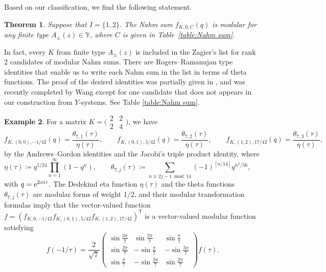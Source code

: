 \documentclass[10pt,a4paper]{amsart}
\numberwithin{equation}{section}
\newtheorem{Theorem}{Theorem}[section]
\theoremstyle{definition}
\newtheorem{Example}[Theorem]{Example}
\begin{document}
Based on our classification, we find the following statement.
\begin{Theorem}
 Suppose that $I= \{1, 2\}$.
 The Nahm sum $f_{K, 0, C} (q)$ is modular for any finite type $A_\pm (z) \in \mathbb{Y}$,
 where $C$ is given in Table~{\rm\ref{table:Nahm sum}}.
\end{Theorem}
In fact, every $K$ from finite type $A_\pm(z)$ is included in the Zagier's list \cite[Table 2]{Zagier}
for rank~$2$ candidates of modular Nahm sums.
There are Rogers--Ramanujan type identities that enable us to write each Nahm sum in the list in terms of theta functions.
The proof of the desired identities was partially given in \cite{Andrews74,CalinescuMilasPenn16,CherednikFeigin, VlasenkoZwegers,Zagier},
and was recently completed by Wang \cite{wang2022rank2} except for one candidate that does not appears in our construction from $Y$-systems.
See Table \ref{table:Nahm sum}.

\begin{Example}
 For a matrix $K =
 \bigl(\begin{smallmatrix}
 2 & 2 \\
 2 & 4
 \end{smallmatrix}\bigr)$,
 we have
 \begin{equation*}
 f_{K, (0, 0), -1/42} (q) = \frac{\theta_{7, 1}(\tau)}{\eta(\tau)}, \qquad
 f_{K, (0, 1), 5/42} (q) = \frac{\theta_{7, 2}(\tau)}{\eta(\tau)}, \qquad
 f_{K, (1, 2), 17/42} (q) = \frac{\theta_{7, 3}(\tau)}{\eta(\tau)},
 \end{equation*}
 by the Andrews--Gordon identities \cite{Andrews74}
 and the Jacobi's triple product identity,
 where
 \begin{equation*}
 \eta (\tau) \coloneqq q^{1/24} \prod_{n=1}^\infty (1 - q^n), \qquad
 \theta_{7,j} (\tau) \coloneqq \sum_{n \equiv 2 j -1 \bmod{14}} (-1)^{[n/14]}
 q^{n^2 / 56}, \qquad
 \end{equation*}
 with $q = {\rm e}^{2 \pi {\rm i} \tau}$.
 The Dedekind eta function $\eta(\tau)$ and the theta functions $\theta_{7,j} (\tau)$
 are modular forms of weight $1/2$,
 and their modular transformation formulas imply that the vector-valued function
 $f = (f_{K,0, -1/42} f_{K, (0,1), 5/42} f_{K, (1,2), 17/42})^{\mathsf{T}}$
 is a vector-valued modular function satisfying
 \begin{equation*}
 f(-1/\tau) =
 \frac{2}{\sqrt{7}}
 \begin{pmatrix}
 \sin \frac{3 \pi}{7} & \sin \frac{2 \pi}{7} & \sin \frac{\pi}{7} \\
 \sin \frac{2 \pi}{7} & -\sin \frac{\pi}{7} & -\sin \frac{3 \pi}{7} \\
 \sin \frac{\pi}{7} & -\sin \frac{3 \pi}{7} & \sin \frac{2 \pi}{7}
 \end{pmatrix}
 f(\tau).
 \end{equation*}
\end{Example}
\end{document}
